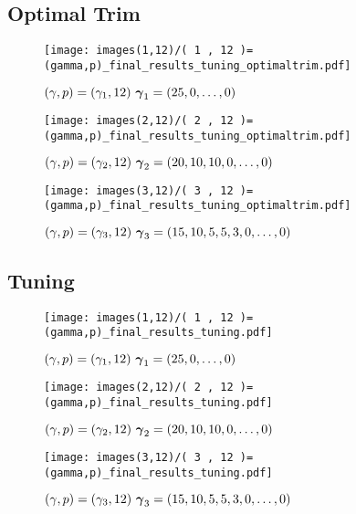 \documentclass[main.tex]{subfiles}
\begin{document}
\subsection{Optimal Trim}
\begin{figure}[H]
    \centering
    \texttt{[image: images(1,12)/( 1 , 12 )=(gamma,p)\_final\_results\_tuning\_optimaltrim.pdf]}
    \caption{$(\gamma, p) = (\gamma_1, 12) \ \gammaone$}
    \label{fig:optimaltrim1-12}
\end{figure}

\begin{figure}[H]
    \centering
    \texttt{[image: images(2,12)/( 2 , 12 )=(gamma,p)\_final\_results\_tuning\_optimaltrim.pdf]}
    \caption{$(\gamma, p) = (\gamma_2, 12) \ \gammatwo$}
    \label{fig:optimaltrim2-12}
\end{figure}

\begin{figure}[H]
    \centering
    \texttt{[image: images(3,12)/( 3 , 12 )=(gamma,p)\_final\_results\_tuning\_optimaltrim.pdf]}
    \caption{$(\gamma, p) = (\gamma_3, 12) \ \gammathree$}
    \label{fig:optimaltrim3-12}
\end{figure}


\subsection{Tuning}
\begin{figure}[H]
    \centering
    \texttt{[image: images(1,12)/( 1 , 12 )=(gamma,p)\_final\_results\_tuning.pdf]}
    \caption{$(\gamma, p) = (\gamma_1, 12) \ \gammaone$}
    \label{fig:tuning1-12}
\end{figure}

\begin{figure}[H]
    \centering
    \texttt{[image: images(2,12)/( 2 , 12 )=(gamma,p)\_final\_results\_tuning.pdf]}
    \caption{$(\gamma, p) = (\gamma_2, 12) \ \gammatwo$}
    \label{fig:tuning2-12}
\end{figure}

\begin{figure}[H]
    \centering
    \texttt{[image: images(3,12)/( 3 , 12 )=(gamma,p)\_final\_results\_tuning.pdf]}
    \caption{$(\gamma, p) = (\gamma_3, 12) \ \gammathree$}
    \label{fig:tuning3-12}
\end{figure}
\end{document}
